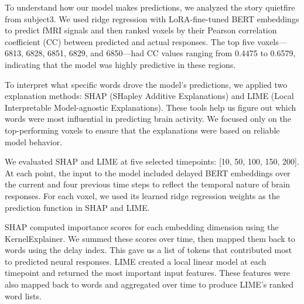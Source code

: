 \documentclass{article}
\begin{document}
To understand how our model makes predictions, we analyzed the story quietfire from subject3. We used ridge regression with LoRA-fine-tuned BERT embeddings to predict fMRI signals and then ranked voxels by their Pearson correlation coefficient (CC) between predicted and actual responses. The top five voxels—6813, 6828, 6851, 6829, and 6850—had CC values ranging from 0.4475 to 0.6579, indicating that the model was highly predictive in these regions.

To interpret what specific words drove the model’s predictions, we applied two explanation methods: SHAP (SHapley Additive Explanations) and LIME (Local Interpretable Model-agnostic Explanations). These tools help us figure out which words were most influential in predicting brain activity. We focused only on the top-performing voxels to ensure that the explanations were based on reliable model behavior.

We evaluated SHAP and LIME at five selected timepoints: [10, 50, 100, 150, 200]. At each point, the input to the model included delayed BERT embeddings over the current and four previous time steps to reflect the temporal nature of brain responses. For each voxel, we used its learned ridge regression weights as the prediction function in SHAP and LIME.

SHAP computed importance scores for each embedding dimension using the KernelExplainer. We summed these scores over time, then mapped them back to words using the delay index. This gave us a list of tokens that contributed most to predicted neural responses. LIME created a local linear model at each timepoint and returned the most important input features. These features were also mapped back to words and aggregated over time to produce LIME’s ranked word lists.

\begin{table}[h]
\centering
{}
\caption{Top-5 influential tokens per voxel identified by SHAP and LIME for \textit{quietfire}.}
\label{tab:shap_lime_quietfire}
\end{table}
\end{document}

